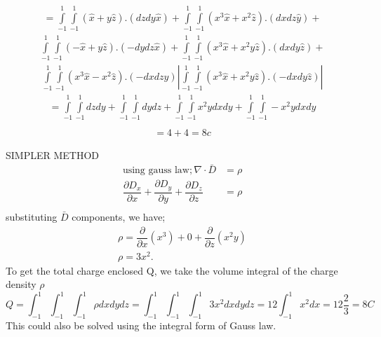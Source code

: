 \begin{exmp}
	\begin{align*}
			={\int\limits_{-1}^{1}\int\limits_{-1}^{1}}(\hat{x}+y\hat{z}).(dzdy\hat{x})+{\int\limits_{-1}^{1}\int\limits_{-1}^{1}}(x^3 \hat{x}+ x^2\hat{z}).(dxdz\hat{y})+
		\end{align*}
	\begin{align*}
			{\int\limits_{-1}^{1}\int\limits_{-1}^{1}}( -\hat{x}+ y\hat{z}).(-dydz\hat{x})+
			{\int\limits_{-1}^{1}\int\limits_{-1}^{1}}(x^3 \hat{x}+ x^2y\hat{z}).(dxdy \hat{z})+
		\end{align*}
	\begin{align*}
			{\int\limits_{-1}^{1}\int\limits_{-1}^{1}}(x^3 \hat{x}- x^2\hat{z}).(-dxdz\hat{y})|
			{\int\limits_{-1}^{1}\int\limits_{-1}^{1}}(x^3 \hat{x}+ x^2y\hat{z}).(-dxdy\hat{z})|
		\end{align*}
	\begin{align*}
			={\int\limits_{-1}^{1}\int\limits_{-1}^{1}}dzdy + {\int\limits_{-1}^{1}\int\limits_{-1}^{1}}dydz +
			{\int\limits_{-1}^{1}\int\limits_{-1}^{1}}x^2ydxdy +
			{\int\limits_{-1}^{1}\int\limits_{-1}^{1}}-x^2ydxdy\\
		\end{align*}
	\begin{align*}
			=4+4 = 8c
		\end{align*}
	
	
	
	
	SIMPLER METHOD	 
	\begin{align*}
			\text{using gauss law}; \nabla\cdot\bar{D}&=\rho\\
			\dfrac{\partial D_{x}}{\partial x}+\dfrac{\partial D_{y}}{\partial y}+\dfrac{\partial 
					D_{z}}{\partial z}&=\rho \\
		\end{align*}
	substituting $\bar{D}$ components, we have;
	\begin{align*}
			\rho= \dfrac{\partial}{\partial x}(x^{3})+ 0 +\dfrac{\partial }{\partial z}(x^{2}y)\\
			\rho=3x^{2} .
		\end{align*}
	To get the total charge enclosed Q, we take the volume integral of the charge density $\rho$
	\begin{dmath*}
			Q=\int_{-1}^{1}\int_{-1}^{1}\int_{-1}^{1}\rho dxdydz
			=\int_{-1}^{1}\int_{-1}^{1}\int_{-1}^{1}3x^{2}dxdydz
			=12\int_{-1}^{1}x^{2}dx= 12\frac{2}{3}
			= 8 C
		\end{dmath*}
	This could also be solved using the integral form of Gauss law.
\end{exmp}

